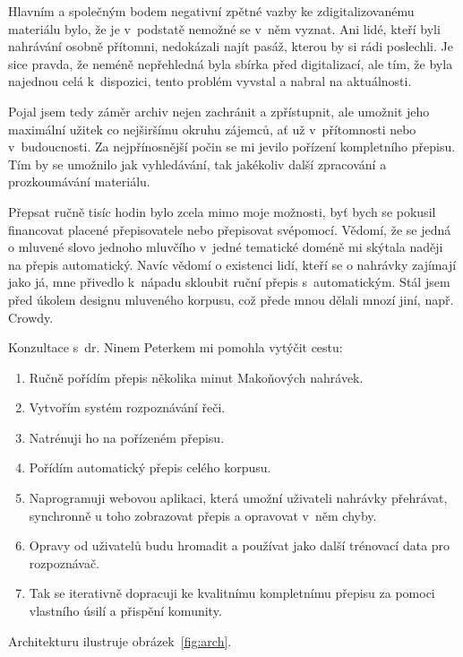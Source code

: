 Hlavním a společným bodem negativní zpětné vazby ke zdigitalizovanému materiálu
bylo, že je v~podstatě nemožné se v~něm vyznat. Ani lidé, kteří byli nahrávání
osobně přítomni, nedokázali najít pasáž, kterou by si rádi poslechli. Je
sice pravda, že neméně nepřehledná byla sbírka před digitalizací, ale tím, že
byla najednou celá k~dispozici, tento problém vyvstal a nabral na aktuálnosti.

Pojal jsem tedy záměr archiv nejen zachránit a zpřístupnit, ale umožnit jeho
maximální užitek co nejširšímu okruhu zájemců, ať už v~přítomnosti nebo
v~budoucnosti.
Za nejpřínosnější počin se mi jevilo pořízení kompletního
přepisu. Tím by se umožnilo jak vyhledávání, tak jakékoliv další zpracování a
prozkoumávání materiálu.

Přepsat ručně tisíc hodin bylo zcela mimo moje možnosti, byť bych se pokusil
financovat placené přepisovatele nebo
přepisovat svépomocí. Vědomí, že se jedná o mluvené slovo jednoho mluvčího
v~jedné tematické doméně mi skýtala naději na přepis automatický. Navíc vědomí o
existenci lidí, kteří se o nahrávky zajímají jako já, mne přivedlo
k~nápadu skloubit ruční přepis s~automatickým.
Stál jsem před úkolem designu mluveného korpusu, což přede mnou dělali mnozí jiní,
např. Crowdy\cite{crowdy1993spoken}.

Konzultace s~dr. Ninem Peterkem mi pomohla vytýčit cestu:
\begin{enumerate}
\item{Ručně pořídím přepis několika minut Makoňových nahrávek.}
\item{Vytvořím systém rozpoznávání řeči.}
\item{Natrénuji ho na pořízeném přepisu.}
\item{Pořídím automatický přepis celého korpusu.}
\item{Naprogramuji webovou aplikaci, která umožní uživateli nahrávky přehrávat,
synchronně u toho zobrazovat přepis a opravovat v~něm chyby.}
\item{Opravy od uživatelů budu hromadit a používat jako další trénovací data pro
rozpoznávač.}
\item{Tak se iterativně dopracuji ke kvalitnímu kompletnímu přepisu za pomoci
vlastního úsilí a přispění komunity.}
\end{enumerate}

Architekturu ilustruje obrázek~\ref{fig:arch}.

